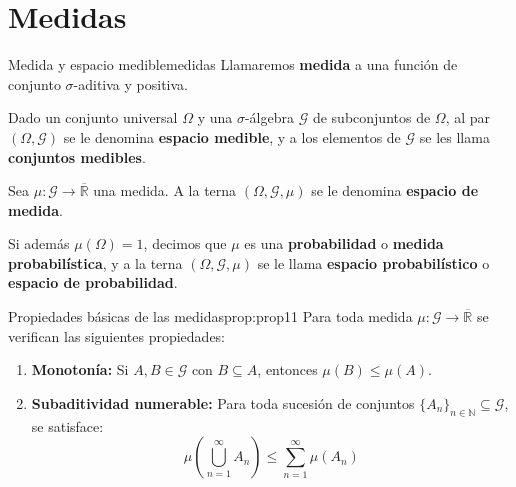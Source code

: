 \newpage
\section{Medidas}
\begin{definicion}{Medida y espacio medible}{medidas}
    Llamaremos \textbf{medida} a una función de conjunto $\sigma$-aditiva y positiva.

    Dado un conjunto universal $\Omega$ y una $\sigma$-álgebra $\mathcal{G}$ de subconjuntos de $\Omega$, al par $(\Omega, \mathcal{G})$ se le denomina \textbf{espacio medible}, y a los elementos de $\mathcal{G}$ se les llama \textbf{conjuntos medibles}.

    Sea $\mu : \mathcal{G} \to \overline{\mathbb{R}}$ una medida. A la terna $(\Omega, \mathcal{G}, \mu)$ se le denomina \textbf{espacio de medida}. 

    Si además $\mu(\Omega) = 1$, decimos que $\mu$ es una \textbf{probabilidad} o \textbf{medida probabilística}, y a la terna $(\Omega, \mathcal{G}, \mu)$ se le llama \textbf{espacio probabilístico} o \textbf{espacio de probabilidad}.

\end{definicion}

\begin{proposicion}{Propiedades básicas de las medidas}{prop:prop11}
Para toda medida $\mu : \mathcal{G} \to \overline{\mathbb{R}}$ se verifican las siguientes propiedades:
\begin{enumerate}[label=\alph*)]
    \item \textbf{Monotonía:} Si $A, B \in \mathcal{G}$ con $B \subseteq A$, entonces $\mu(B) \le \mu(A)$.
    \item \textbf{Subaditividad numerable:} Para toda sucesión de conjuntos $\{A_n\}_{n \in \mathbb{N}} \subseteq \mathcal{G}$, se satisface:
    \[
        \mu\left( \bigcup_{n=1}^\infty A_n \right) \le \sum_{n=1}^\infty \mu(A_n)
    \]
\end{enumerate}
\end{proposicion}


